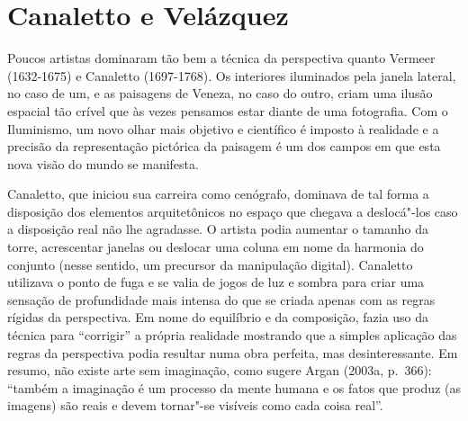 \chapter{Canaletto e Velázquez}

Poucos artistas dominaram tão bem a técnica da perspectiva quanto
Vermeer (1632-1675) e Canaletto (1697-1768). Os interiores iluminados
pela janela lateral, no caso de um, e as paisagens de Veneza, no caso do
outro, criam uma ilusão espacial tão crível que às vezes pensamos estar
diante de uma fotografia. Com o Iluminismo, um novo olhar mais objetivo
e científico é imposto à realidade e a precisão da representação
pictórica da paisagem é um dos campos em que esta nova visão do mundo se
manifesta.

Canaletto, que iniciou sua carreira como cenógrafo, dominava de tal
forma a disposição dos elementos arquitetônicos no espaço que chegava a
deslocá"-los caso a disposição real não lhe agradasse. O artista podia
aumentar o tamanho da torre, acrescentar janelas ou deslocar uma coluna
em nome da harmonia do conjunto (nesse sentido, um precursor da
manipulação digital). Canaletto utilizava o ponto de fuga e se valia de
jogos de luz e sombra para criar uma sensação de profundidade mais
intensa do que se criada apenas com as regras rígidas da perspectiva. Em
nome do equilíbrio e da composição, fazia uso da técnica para
``corrigir'' a própria realidade mostrando que a simples aplicação das
regras da perspectiva podia resultar numa obra perfeita, mas
desinteressante. Em resumo, não existe arte sem imaginação, como sugere
Argan (2003a, p.~366): ``também a imaginação é um processo da mente
humana e os fatos que produz (as imagens) são reais e devem tornar"-se
visíveis como cada coisa real''.

